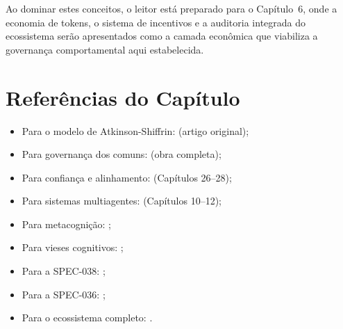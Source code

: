 \begin{table}[htb]
\centering
    \small
\caption{Competências adquiridas no Capítulo 5}
\label{tab:competencias-cap5}
\end{table}

Ao dominar estes conceitos, o leitor está preparado para o
Capítulo~6, onde a economia de tokens, o sistema de incentivos e a
auditoria integrada do ecossistema serão apresentados como a camada
econômica que viabiliza a governança comportamental aqui estabelecida.

\section*{Referências do Capítulo}
\begin{itemize}
\item Para o modelo de Atkinson-Shiffrin: \cite{atkinson1968human}
(artigo original);
\item Para governança dos comuns: \cite{ostrom1990governing}
(obra completa);
\item Para confiança e alinhamento: \cite{russell2020inteligencia}
(Capítulos 26--28);
\item Para sistemas multiagentes: \cite{wooldridge2009multiagent}
(Capítulos 10--12);
\item Para metacognição: \cite{flavell1976metacognitive,
schraw2006metacognitive};
\item Para vieses cognitivos: \cite{kahneman2003perspective};
\item Para a SPEC-038: \cite{opencode2026spec038};
\item Para a SPEC-036: \cite{opencode2026spec036};
\item Para o ecossistema completo: \cite{opencode2026ecosystem}.
\end{itemize}

